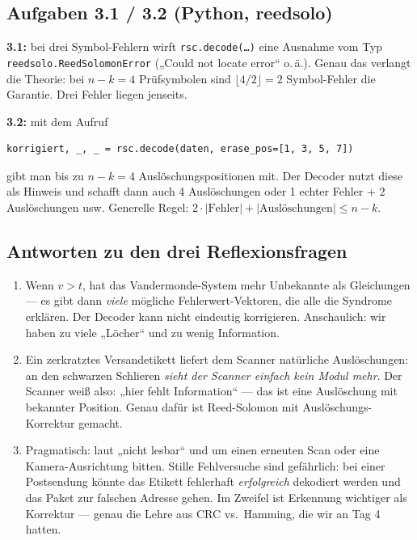 \subsection*{Aufgaben 3.1 / 3.2 (Python, reedsolo)}

\textbf{3.1:} bei drei Symbol-Fehlern wirft \texttt{rsc.decode(\dots)}
eine Ausnahme vom Typ \texttt{reedsolo.ReedSolomonError} („Could not
locate error“ o.\,ä.). Genau das verlangt die Theorie: bei $n-k = 4$
Prüfsymbolen sind $\lfloor 4/2 \rfloor = 2$ Symbol-Fehler die
Garantie. Drei Fehler liegen jenseits.

\textbf{3.2:} mit dem Aufruf
\begin{verbatim}
korrigiert, _, _ = rsc.decode(daten, erase_pos=[1, 3, 5, 7])
\end{verbatim}
gibt man bis zu $n - k = 4$ Auslöschungspositionen mit. Der Decoder
nutzt diese als Hinweis und schafft dann auch 4 Auslöschungen oder
1 echter Fehler + 2 Auslöschungen usw. Generelle Regel:
$2 \cdot |\text{Fehler}| + |\text{Auslöschungen}| \le n - k$.

\subsection*{Antworten zu den drei Reflexionsfragen}

\begin{enumerate}
\item Wenn $v > t$, hat das Vandermonde-System mehr Unbekannte als
  Gleichungen — es gibt dann \emph{viele} mögliche Fehlerwert-Vektoren,
  die alle die Syndrome erklären. Der Decoder kann nicht eindeutig
  korrigieren. Anschaulich: wir haben zu viele „Löcher“ und zu wenig
  Information.

\item Ein zerkratztes Versandetikett liefert dem Scanner natürliche
  Auslöschungen: an den schwarzen Schlieren \emph{sieht der Scanner
  einfach kein Modul mehr}. Der Scanner weiß also: „hier fehlt
  Information“ — das ist eine Auslöschung mit bekannter Position.
  Genau dafür ist Reed-Solomon mit Auslöschungs-Korrektur gemacht.

\item Pragmatisch: laut „nicht lesbar“ und um einen erneuten Scan
  oder eine Kamera-Ausrichtung bitten. Stille Fehlversuche sind
  gefährlich: bei einer Postsendung könnte das Etikett
  fehlerhaft \emph{erfolgreich} dekodiert werden und das Paket zur
  falschen Adresse gehen. Im Zweifel ist Erkennung wichtiger als
  Korrektur — genau die Lehre aus CRC vs.\ Hamming, die wir an
  Tag 4 hatten.
\end{enumerate}
